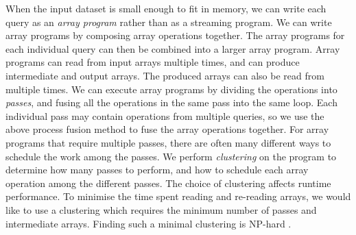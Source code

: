 

When the input dataset is small enough to fit in memory, we can write each query as an \emph{array program} rather than as a streaming program.
We can write array programs by composing array operations together.
The array programs for each individual query can then be combined into a larger array program.
Array programs can read from input arrays multiple times, and can produce intermediate and output arrays.
The produced arrays can also be read from multiple times.
We can execute array programs by dividing the operations into \emph{passes}, and fusing all the operations in the same pass into the same loop. %
Each individual pass may contain operations from multiple queries, so we use the above process fusion method to fuse the array operations together.
For array programs that require multiple passes, there are often many different ways to schedule the work among the passes.
We perform \emph{clustering} on the program to determine how many passes to perform, and how to schedule each array operation among the different passes.
The choice of clustering affects runtime performance.
To minimise the time spent reading and re-reading arrays, we would like to use a clustering which requires the minimum number of passes and intermediate arrays.
Finding such a minimal clustering is NP-hard \cite{darte1999complexity}.

